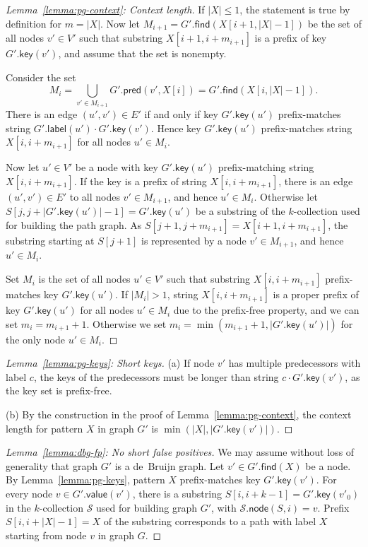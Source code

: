 \documentclass[twoside,leqno,twocolumn]{article}
\newcommand{\abs}[1]{\ensuremath{\lvert #1 \rvert}}
\newcommand{\find}{\ensuremath{\mathsf{find}}}
\newcommand{\glabel}{\ensuremath{\mathsf{label}}}
\newcommand{\gpred}{\ensuremath{\mathsf{pred}}}
\newcommand{\gkey}{\ensuremath{\mathsf{key}}}
\newcommand{\gvalue}{\ensuremath{\mathsf{value}}}
\newcommand{\gnode}{\ensuremath{\mathsf{node}}}
\newcommand{\kcollection}[1]{$#1$\nobreakdash-collection}
\begin{document}
\begin{proof}[Lemma~\ref{lemma:pg-context}: Context length]
If $\abs{X} \le 1$, the statement is true by definition for $m = \abs{X}$. Now let $M_{i+1} = G'.\find(X[i+1, \abs{X}-1])$ be the set of all nodes $v' \in V'$ such that substring $X[i+1, i+m_{i+1}]$ is a prefix of key $G'.\gkey(v')$, and assume that the set is nonempty.

Consider the set
$$
M_{i} = \bigcup_{v' \in M_{i+1}} G'.\gpred(v', X[i]) = G'.\find(X[i, \abs{X}-1]).
$$
There is an edge $(u', v') \in E'$ if and only if key $G'.\gkey(u')$ prefix-matches string $G'.\glabel(u') \cdot G'.\gkey(v')$. Hence key $G'.\gkey(u')$ prefix-matches string $X[i, i+m_{i+1}]$ for all nodes $u' \in M_{i}$.

Now let $u' \in V'$ be a node with key $G'.\gkey(u')$ prefix-matching string $X[i, i+m_{i+1}]$. If the key is a prefix of string $X[i, i+m_{i+1}]$, there is an edge $(u', v') \in E'$ to all nodes $v' \in M_{i+1}$, and hence $u' \in M_{i}$. Otherwise let $S[j, j+\abs{G'.\gkey(u')}-1] = G'.\gkey(u')$ be a substring of the \kcollection{k} used for building the path graph. As $S[j+1, j+m_{i+1}] = X[i+1, i+m_{i+1}]$, the substring starting at $S[j+1]$ is represented by a node $v' \in M_{i+1}$, and hence $u' \in M_{i}$.

Set $M_{i}$ is the set of all nodes $u' \in V'$ such that substring $X[i, i+m_{i+1}]$ prefix-matches key $G'.\gkey(u')$. If $\abs{M_{i}} > 1$, string $X[i, i+m_{i+1}]$ is a proper prefix of key $G'.\gkey(u')$ for all nodes $u' \in M_{i}$ due to the prefix-free property, and we can set $m_{i} = m_{i+1}+1$. Otherwise we set $m_{i} = \min(m_{i+1}+1, \abs{G'.\gkey(u')})$ for the only node $u' \in M_{i}$.
\end{proof}

\begin{proof}[Lemma~\ref{lemma:pg-keys}: Short keys]
(a) If node $v'$ has multiple predecessors with label $c$, the keys of the predecessors must be longer than string $c \cdot G'.\gkey(v')$, as the key set is prefix-free.

(b) By the construction in the proof of Lemma~\ref{lemma:pg-context}, the context length for pattern $X$ in graph $G'$ is $\min(\abs{X}, \abs{G'.\gkey(v')})$.
\end{proof}

\begin{proof}[Lemma~\ref{lemma:dbg-fp}: No short false positives]
We may assume without loss of generality that graph $G'$ is a de~Bruijn graph. Let $v' \in G'.\find(X)$ be a node. By Lemma~\ref{lemma:pg-keys}, pattern $X$ prefix-matches key $G'.\gkey(v')$. For every node $v \in G'.\gvalue(v')$, there is a substring $S[i, i+k-1] = G'.\gkey(v'_{0})$ in the \kcollection{k} $\mathcal{S}$ used for building graph $G'$, with $\mathcal{S}.\gnode(S, i) = v$. Prefix $S[i, i+\abs{X}-1] = X$ of the substring corresponds to a path with label $X$ starting from node $v$ in graph $G$.
\end{proof}
\end{document}
